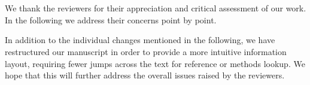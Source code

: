 




\vspace{1em}

\section*{\mytitle}
We thank the reviewers for their appreciation and critical assessment of our work.
In the following we address their concerns point by point.

In addition to the individual changes mentioned in the following, we have restructured our manuscript in order to provide a more intuitive information layout, requiring fewer jumps across the text for reference or methods lookup.
We hope that this will further address the overall issues raised by the reviewers.





